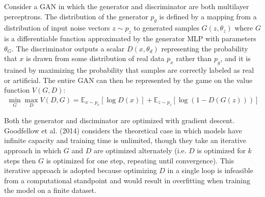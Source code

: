 \documentclass[12pt, reqno]{amsart}
\begin{document}
Consider a GAN in which the generator and discriminator are both multilayer perceptrons. The distribution of the generator $p_g$ is defined by a mapping from a distribution of input noise vectors $z \sim p_z$ to generated samples $G(z, \theta_z)$ where $G$ is a differentiable function approximated by the generator MLP with parameters $\theta_G$. The discriminator outputs a scalar $D(x, \theta_d)$ representing the probability that $x$ is drawn from some distribution of real data $p_x$ rather than $p_g$, and it is trained by maximizing the probability that samples are correctly labeled as real or artificial. The entire GAN can then be represented by the game on the value function $V(G, D)$:
\begin{align*}
    \min_G \max_D V(D, G) = \mathbb{E}_{x \sim p_x} [\log D(x)] + \mathbb{E}_{z \sim p_z} [\log (1 - D(G(z)))]
\end{align*}

Both the generator and disciminator are optimized with gradient descent. Goodfellow et al. (2014) considers the theoretical case in which models have infinite capacity and training time is unlimited, though they take an iterative approach in which $G$ and $D$ are optimized alternately (i.e. $D$ is optimized for $k$ steps then $G$ is optimized for one step, repeating until convergence). This iterative approach is adopted because optimizing $D$ in a single loop is infeasible from a computational standpoint and would result in overfitting when training the model on a finite dataset. \\
\end{document}
